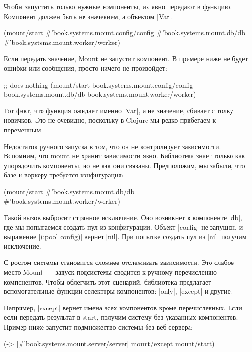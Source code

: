 Чтобы запустить только нужные компоненты, их явно передают в функцию. Компонент
должен быть не значением, а объектом \spverb|Var|.

\begin{code}
(mount/start #'book.systems.mount.config/config
             #'book.systems.mount.db/db
             #'book.systems.mount.worker/worker)
\end{code}

Если передать значение, Mount не запустит компонент. В примере ниже не будет
ошибки или сообщения, просто ничего не произойдет:

\begin{code}
;; does nothing
(mount/start book.systems.mount.config/config
             book.systems.mount.db/db
             book.systems.mount.worker/worker)
\end{code}

Тот факт, что функция ожидает именно \spverb|Var|, а не значение, сбивает с толку
новичков. Это не очевидно, поскольку в Clojure мы редко прибегаем к переменным.

Недостаток ручного запуска в том, что он не контролирует зависимости. Вспомним,
что mount не хранит зависимости явно. Библиотека знает только как упорядочить
компоненты, но не как они связаны. Предположим, мы забыли, что базе и воркеру
требуется конфигурация:

\begin{code}
(mount/start #'book.systems.mount.db/db
             #'book.systems.mount.worker/worker)
\end{code}

Такой вызов выбросит странное исключение. Оно возникнет в компоненте \spverb|db|, где
мы попытаемся создать пул из конфигурации. Объект \spverb|config| не запущен, и
выражение \spverb|(:pool config)| вернет \spverb|nil|. При попытке создать пул из \spverb|nil|
получим исключение.

С ростом системы становится сложнее отслеживать зависимости. Это слабое место
Mount~--- запуск подсистемы сводится к ручному перечислению компонентов. Чтобы
облегчить этот сценарий, библиотека предлагает вспомогательные функции-селекторы
компонентов: \spverb|only|, \spverb|except| и другие.

Например, \spverb|except| вернет имена всех компонентов кроме перечисленных. Если если
передать результат в start, получим систему без указанных компонентов. Пример
ниже запустит подмножество системы без веб-сервера:

\begin{code}
(-> [#'book.systems.mount.server/server]
    mount/except
    mount/start)
\end{code}

